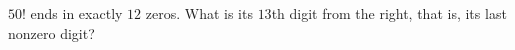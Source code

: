 $50!$ ends in exactly $12$ zeros. What is its $13$th digit from the right, that is, its last nonzero digit?
